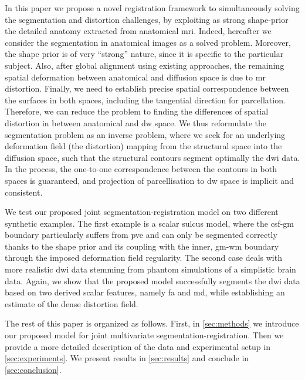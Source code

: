 In this paper we propose a novel registration framework to simultaneously
solving the segmentation and distortion challenges, by exploiting as strong 
shape-prior the detailed anatomy extracted from anatomical \ac{mri}. Indeed,
hereafter we consider the segmentation in anatomical images as a solved problem.
Moreover, the shape prior is of very ``strong'' nature, since it is specific to 
the particular subject. Also, after global alignment using existing approaches, 
the remaining spatial deformation between anatomical and diffusion space is 
due to \ac{mr} distortion. Finally, we need to establish precise spatial 
correspondence between the surfaces in both spaces, including the tangential 
direction for parcellation. Therefore, we can reduce the problem to finding 
the differences of spatial distortion in between anatomical and \ac{dw} space.
We thus reformulate the segmentation problem as an inverse problem, where we 
seek for an underlying deformation field (the distortion) mapping 
from the structural space into the diffusion space, such that the structural 
contours segment optimally the \ac{dwi} data. In the process, the one-to-one 
correspondence between the contours in both spaces is guaranteed, and projection 
of parcellisation to \ac{dw} space is implicit and consistent.

We test our proposed joint segmentation-registration model on two different 
synthetic examples. The first example is a scalar sulcus model, where the 
\ac{csf}-\ac{gm} boundary particularly suffers from \ac{pve} and can only be 
segmented correctly thanks to the shape prior and its coupling with the inner, 
\ac{gm}-\ac{wm} boundary through the imposed deformation field regularity. 
The second case deals with more realistic \ac{dwi} data stemming from 
phantom simulations of a simplistic brain data. Again, we show that the 
proposed model successfully segments the \ac{dwi} data based on two derived 
scalar features, namely \ac{fa} and \ac{md}, while establishing an estimate 
of the dense distortion field.

The rest of this paper is organized as follows. First, in \autoref{sec:methods}
we introduce our proposed model for joint multivariate segmentation-registration.
Then we provide a more detailed description of the data and experimental setup in
\autoref{sec:experiments}. We present results in \autoref{sec:results} and conclude 
in \autoref{sec:conclusion}.